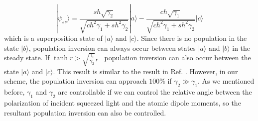 \documentclass[aps,showpacs,twocolumn,twoside,groupedaddress]{revtex4}
\begin{document}
\begin{equation}
|\psi_{ss}\rangle=\frac{sh\sqrt{\gamma_{2}}}{\sqrt{ch^{2}\gamma_{1}+sh^{2}\gamma_{2}}}|a\rangle-\frac{ch\sqrt{\gamma_{1}}}{\sqrt{ch^{2}\gamma_{1}+sh^{2}\gamma_{2}}}|c\rangle
\end{equation}
which is a superposition state of $|a\rangle$ and $|c\rangle$. Since there is no population in the state $|b\rangle$,  population inversion can always occur between states $|a\rangle$ and $|b\rangle$ in the steady state. If $\tanh r>\sqrt{\frac{\gamma_{1}}{\gamma_{2}}}$， population inversion can also occur between the state $|a\rangle$ and $|c\rangle$. This  result is similar to the result in Ref.  \cite{ficek1993two}. However, in our scheme, the population inversion can approach $100\%$ if $\gamma_2\gg\gamma_1$.  As we mentioned before, $\gamma_1$ and $\gamma_2$ are controllable if we can control the relative angle between the polarization of incident squeezed light and the atomic dipole moments, so the resultant population inversion can also be controlled.
\end{document}
